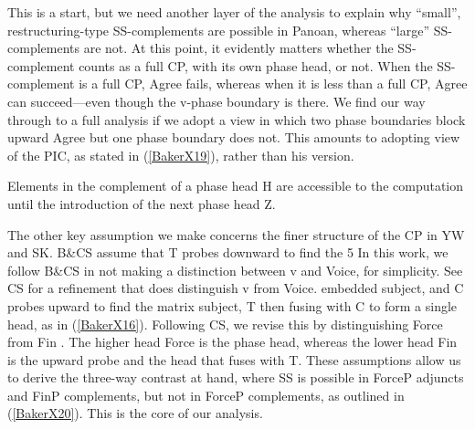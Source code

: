 \documentclass[output=paper,colorlinks,citecolor=brown,
]{langscibook}
\begin{document}
This is a start, but we need another layer of the analysis to explain why “small”, restructuring-type SS-complements are possible in Panoan, whereas “large” SS-complements are not. At this point, it evidently matters whether the SS-complement counts as a full CP, with its own phase head, or not. When the SS-complement is a full CP, Agree fails, whereas when it is less than a full CP, Agree can succeed—even though the v-phase boundary is there. We find our way through to a full analysis if we adopt a view in which two phase boundaries block upward Agree but one phase boundary does not. This amounts to adopting \citet[13-14]{chomsky2001derivation} view of the PIC, as stated in (\ref{BakerX19}), rather than his \citeyearpar{chomsky2000minimalist} version.

\begin{exe}
    \ex Elements in the complement of a phase head H are accessible to the computation until the introduction of the next phase head Z. \label{BakerX19}
\end{exe}

The other key assumption we make concerns the finer structure of the CP in YW and SK. B\&CS assume that T probes downward to find the
5 In this work, we follow B\&CS in not making a distinction between v and Voice, for simplicity. See CS for a refinement that does distinguish v from Voice.
embedded subject, and C probes upward to find the matrix subject, T then fusing with C to form a single head, as in (\ref{BakerX16}). Following CS, we revise this by distinguishing Force from Fin \citep{rizzi1997fine}. The higher head Force is the phase head, whereas the lower head Fin is the upward probe and the head that fuses with T. These assumptions allow us to derive the three-way contrast at hand, where SS is possible in ForceP adjuncts and FinP complements, but not in ForceP complements, as outlined in (\ref{BakerX20}). This is the core of our analysis.
\end{document}
